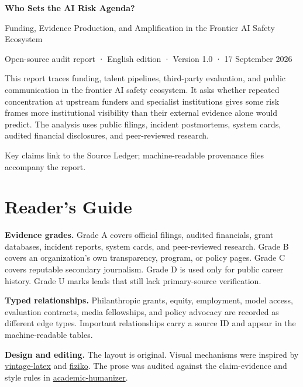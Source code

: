 \documentclass[11pt,twoside]{article}
\begin{document}
\thispagestyle{empty}
\begin{center}
\vspace*{18mm}
{\fontsize{28}{32}\selectfont\bfseries Who Sets the AI Risk Agenda?}\par
\vspace{7mm}
{\large Funding, Evidence Production, and Amplification in the Frontier AI Safety Ecosystem}\par
\vspace{6mm}\printerrule\vspace{4mm}
{\small Open-source audit report · English edition · Version 1.0 · 17 September 2026}\par
\vspace{14mm}
\begin{minipage}{0.80\textwidth}
\small
This report traces funding, talent pipelines, third-party evaluation, and public communication in the frontier AI safety ecosystem. It asks whether repeated concentration at upstream funders and specialist institutions gives some risk frames more institutional visibility than their external evidence alone would predict. The analysis uses public filings, incident postmortems, system cards, audited financial disclosures, and peer-reviewed research.
\end{minipage}
\vfill
{\footnotesize Key claims link to the Source Ledger; machine-readable provenance files accompany the report.}\par
\end{center}
\clearpage

\section*{Reader's Guide}
\noindent\textbf{Evidence grades.} Grade A covers official filings, audited financials, grant databases, incident reports, system cards, and peer-reviewed research. Grade B covers an organization's own transparency, program, or policy pages. Grade C covers reputable secondary journalism. Grade D is used only for public career history. Grade U marks leads that still lack primary-source verification.

\noindent\textbf{Typed relationships.} Philanthropic grants, equity, employment, model access, evaluation contracts, media fellowships, and policy advocacy are recorded as different edge types. Important relationships carry a source ID and appear in the machine-readable tables.

\noindent\textbf{Design and editing.} The layout is original. Visual mechanisms were inspired by \href{https://github.com/Foadsf/vintage-latex}{vintage-latex} and \href{https://github.com/jemmybutton/fiziko}{fiziko}. The prose was audited against the claim-evidence and style rules in \href{https://github.com/AIScientists-Dev/academic-humanizer}{academic-humanizer}.
\end{document}
